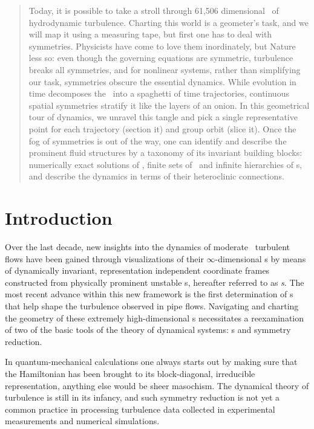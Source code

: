 \documentclass[aip,cha,reprint,
secnumarabic,
nofootinbib, tightenlines,
nobibnotes, showkeys, showpacs,
groupedaddress
]{revtex4-1}
\begin{document}
    \begin{quotation}
Today, it is possible to take a stroll through 61,506 dimensional
\statesp\ of hydrodynamic turbulence. Charting this world is a geometer's
task, and we will map it using a measuring tape, but first one has to
deal with symmetries. Physicists have come to love them inordinately, but
Nature less so: even though the governing equations are symmetric,
turbulence breaks all symmetries, and for nonlinear systems, rather than
simplifying our task, symmetries obscure the essential dynamics. While
evolution in time decomposes the \statesp\ into a spaghetti of time
trajectories, continuous spatial symmetries stratify it like the layers
of an onion. In this geometrical tour of dynamics, we unravel this tangle
and pick a single representative point for each trajectory (section it)
and  group orbit (slice it). Once the fog of symmetries is out of the
way, one can identify and describe the prominent fluid structures by a
taxonomy of its invariant building blocks: numerically exact solutions of
\NSe, finite sets of \reqva\ and infinite hierarchies of \rpo s, and
describe the dynamics in terms of their heteroclinic connections.
    \end{quotation}

\section{Introduction}
\label{s:intro}

Over the last decade, new insights into the dynamics of moderate
\Reynolds\ turbulent flows have been gained through visualizations of
their $\infty$-dimensional \statesp s by means of dynamically invariant,
representation independent coordinate frames constructed from
physically prominent unstable {\cohStr s}, hereafter referred to as {\em
\template s}.
The most recent advance within this new framework is the first
determination of \rpo s that help shape the turbulence observed in pipe
flows. Navigating and charting the geometry of these
extremely high-dimensional \statesp s necessitates a reexamination of two
of the basic tools of the theory of dynamical systems: \PoincSec s and
symmetry reduction.

In quantum-mechanical calculations one always starts out by making sure
that the Hamiltonian has been brought to its block-diagonal, irreducible
representation, anything else would be sheer masochism.
The dynamical theory of turbulence is still in its infancy, and such
symmetry reduction is not yet a common practice in processing  turbulence
data collected in experimental measurements and numerical simulations.
\end{document}

